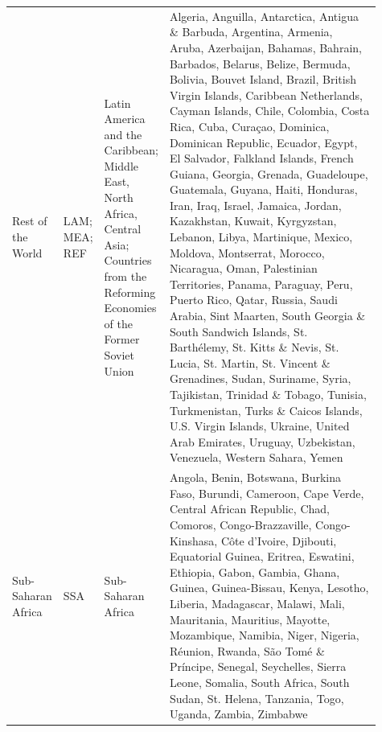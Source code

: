 \begin{longtable}{>{\raggedright\arraybackslash}p{0.12\linewidth}>{\raggedright\arraybackslash}p{0.03\linewidth}>{\raggedright\arraybackslash}p{0.16\linewidth}>{\raggedright\arraybackslash}p{0.6\linewidth}}
Rest of the World & LAM; MEA; REF & Latin America and the Caribbean; Middle East, North Africa, Central Asia; Countries from the Reforming Economies of the Former Soviet Union & Algeria, Anguilla, Antarctica, Antigua \& Barbuda, Argentina, Armenia, Aruba, Azerbaijan, Bahamas, Bahrain, Barbados, Belarus, Belize, Bermuda, Bolivia, Bouvet Island, Brazil, British Virgin Islands, Caribbean Netherlands, Cayman Islands, Chile, Colombia, Costa Rica, Cuba, Curaçao, Dominica, Dominican Republic, Ecuador, Egypt, El Salvador, Falkland Islands, French Guiana, Georgia, Grenada, Guadeloupe, Guatemala, Guyana, Haiti, Honduras, Iran, Iraq, Israel, Jamaica, Jordan, Kazakhstan, Kuwait, Kyrgyzstan, Lebanon, Libya, Martinique, Mexico, Moldova, Montserrat, Morocco, Nicaragua, Oman, Palestinian Territories, Panama, Paraguay, Peru, Puerto Rico, Qatar, Russia, Saudi Arabia, Sint Maarten, South Georgia \& South Sandwich Islands, St. Barthélemy, St. Kitts \& Nevis, St. Lucia, St. Martin, St. Vincent \& Grenadines, Sudan, Suriname, Syria, Tajikistan, Trinidad \& Tobago, Tunisia, Turkmenistan, Turks \& Caicos Islands, U.S. Virgin Islands, Ukraine, United Arab Emirates, Uruguay, Uzbekistan, Venezuela, Western Sahara, Yemen \\
Sub-Saharan Africa & SSA & Sub-Saharan Africa & Angola, Benin, Botswana, Burkina Faso, Burundi, Cameroon, Cape Verde, Central African Republic, Chad, Comoros, Congo-Brazzaville, Congo-Kinshasa, Côte d'Ivoire, Djibouti, Equatorial Guinea, Eritrea, Eswatini, Ethiopia, Gabon, Gambia, Ghana, Guinea, Guinea-Bissau, Kenya, Lesotho, Liberia, Madagascar, Malawi, Mali, Mauritania, Mauritius, Mayotte, Mozambique, Namibia, Niger, Nigeria, Réunion, Rwanda, São Tomé \& Príncipe, Senegal, Seychelles, Sierra Leone, Somalia, South Africa, South Sudan, St. Helena, Tanzania, Togo, Uganda, Zambia, Zimbabwe \\
\end{longtable}
